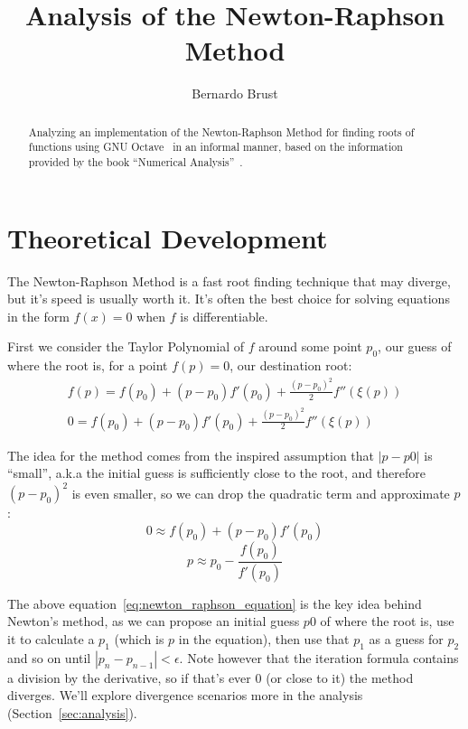 \documentclass[12pt]{article}
\title{Analysis of the Newton-Raphson Method}
\author{Bernardo Brust}
\theoremstyle{remark}
\begin{document}
\maketitle

\begin{abstract}
  Analyzing an implementation of the Newton-Raphson Method for finding roots of functions using GNU Octave~\cite{octave} in an informal manner, based on the information provided by the book ``Numerical Analysis''~\cite{book}.
\end{abstract}

\section{Theoretical Development}\label{sec:intro}

The Newton-Raphson Method is a fast root finding technique that may diverge, but it's speed is usually worth it. It's often the best choice for solving equations in the form $f(x) = 0$ when $f$ is differentiable.

First we consider the Taylor Polynomial of $f$ around some point $p_0$, our guess of where the root is, for a point $f(p) = 0$, our destination root:
\begin{gather*}
    f(p) = f(p_0) + (p - p_0)f'(p_0) + \frac{{(p - p_0)}^2}{2}f''(\xi(p)) \\
    0 = f(p_0) + (p - p_0)f'(p_0) + \frac{{(p - p_0)}^2}{2}f''(\xi(p))
\end{gather*}

The idea for the method comes from the inspired assumption that $|p - p0|$ is ``small'', a.k.a the initial guess is sufficiently close to the root, and therefore ${(p - p_0)}^2$ is even smaller, so we can drop the quadratic term and approximate $p$:
\[
  0 \approx f(p_0) + (p - p_0)f'(p_0)
\]
\begin{equation}\label{eq:newton_raphson_equation}
  p \approx p_0 - \frac{f(p_0)}{f'(p_0)}
\end{equation}

The above equation~\eqref{eq:newton_raphson_equation} is the key idea behind Newton's method, as we can propose an initial guess $p0$ of where the root is, use it to calculate a $p_1$ (which is $p$ in the equation), then use that $p_1$ as a guess for $p_2$ and so on until $|p_n - p_{n-1}| < \epsilon$. Note however that the iteration formula contains a division by the derivative, so if that's ever $0$ (or close to it) the method diverges. We'll explore divergence scenarios more in the analysis (Section~\ref{sec:analysis}).
\end{document}
